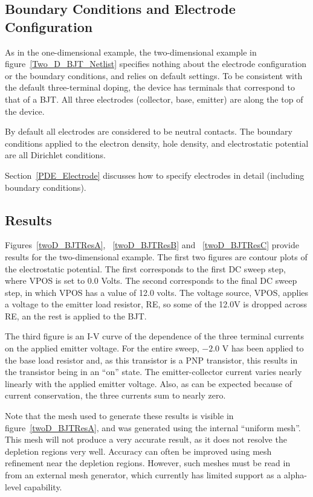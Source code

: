 \subsection{Boundary Conditions and Electrode Configuration}
As in the one-dimensional example, the two-dimensional example in
figure~\ref{Two_D_BJT_Netlist} specifies nothing about
the electrode configuration or the boundary conditions, and relies on
default settings.  To be consistent with the default three-terminal doping,
the device has terminals that correspond to that of a BJT.  All three
electrodes (collector, base, emitter) are along the top of the device.

By default all electrodes are considered to be neutral contacts.  The 
boundary conditions applied to the electron density, hole density, and 
electrostatic potential are all Dirichlet conditions.

Section~\ref{PDE_Electrode} discusses how to specify electrodes in detail 
(including boundary conditions).

\subsection{Results}
Figures~\ref{twoD_BJTResA}, ~\ref{twoD_BJTResB} and ~\ref{twoD_BJTResC} provide 
results for the two-dimensional example.  The first two figures are contour plots 
of the electrostatic potential.  The first corresponds to the first DC sweep step, 
where VPOS is set to 0.0 Volts.  The second corresponds to the final DC sweep 
step, in which VPOS has a value of 12.0 volts.  The voltage source, VPOS, 
applies a voltage to the emitter load resistor, RE, so some of the 12.0V is 
dropped across RE, an the rest is applied to the BJT.

The third figure is an I-V curve of the dependence of the three terminal currents 
on the applied emitter voltage.  For the entire sweep, $-2.0$ V has been applied to 
the base load resistor and, as this transistor is a PNP transistor, this results 
in the transistor being in an ``on'' state.  The emitter-collector current varies 
nearly linearly with the applied emitter voltage. Also, as can be expected 
because of current conservation, the three currents sum to nearly zero.

Note that the mesh used to generate these results is visible in 
figure~\ref{twoD_BJTResA}, and was generated using the internal ``uniform mesh''.  
This mesh will not produce a very accurate result, as it does not 
resolve the depletion regions very well.  Accuracy can often be improved 
using mesh refinement near the depletion regions.  However, such meshes must be 
read in from an external mesh generator, which currently has limited support
as a alpha-level capability.

